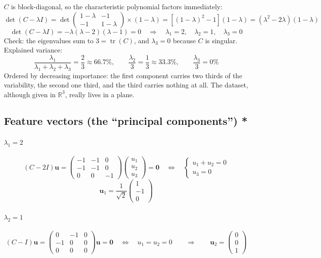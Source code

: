 \documentclass[]{article}
\newcommand{\R}{\mathbb{R}}
\begin{document}
	$C$ is block-diagonal, so the characteristic polynomial factors immediately:
	$$
	\det(C - \lambda I)
	= \det \begin{pmatrix} 1-\lambda & -1 \\ -1 & 1-\lambda \end{pmatrix} \times (1 - \lambda)
	= \left[ (1-\lambda)^2 - 1 \right](1 - \lambda)
	= (\lambda^2 - 2\lambda)(1 - \lambda)
	$$
	$$
	\det(C - \lambda I) = -\lambda(\lambda - 2)(\lambda - 1) = 0
	\quad\Longrightarrow\quad
	\lambda_1 = 2, \quad \lambda_2 = 1, \quad \lambda_3 = 0
	$$
	Check: the eigenvalues sum to $3 = \operatorname{tr}(C)$, and $\lambda_3 = 0$ because $C$ is singular.
	Explained variance:
	$$
	\frac{\lambda_1}{\lambda_1 + \lambda_2 + \lambda_3} = \frac{2}{3} \approx 66.7\%,
	\qquad
	\frac{\lambda_2}{3} = \frac{1}{3} \approx 33.3\%,
	\qquad
	\frac{\lambda_3}{3} = 0\%
	$$
	Ordered by decreasing importance: the first component carries two thirds of the variability, the second one third, and the third carries nothing at all.
	The dataset, although given in $\R^3$, really lives in a plane.

	\subsection{Feature vectors (the ``principal components'') *}

	\paragraph{$\lambda_1 = 2$}\mbox{}
	$$
	(C - 2I)\mathbf{u} =
	\begin{pmatrix}
		-1 & -1 & 0 \\
		-1 & -1 & 0 \\
		0 & 0 & -1
	\end{pmatrix}
	\begin{pmatrix} u_1 \\ u_2 \\ u_3 \end{pmatrix} = \mathbf{0}
	\quad\Longleftrightarrow\quad
	\begin{cases} u_1 + u_2 = 0 \\ u_3 = 0 \end{cases}
	$$
	$$
	\mathbf{u}_1 = \frac{1}{\sqrt{2}} \begin{pmatrix} 1 \\ -1 \\ 0 \end{pmatrix}
	$$

	\paragraph{$\lambda_2 = 1$}\mbox{}
	$$
	(C - I)\mathbf{u} =
	\begin{pmatrix}
		0 & -1 & 0 \\
		-1 & 0 & 0 \\
		0 & 0 & 0
	\end{pmatrix}
	\mathbf{u} = \mathbf{0}
	\quad\Longleftrightarrow\quad
	u_1 = u_2 = 0
	\qquad\Longrightarrow\qquad
	\mathbf{u}_2 = \begin{pmatrix} 0 \\ 0 \\ 1 \end{pmatrix}
	$$
\end{document}
